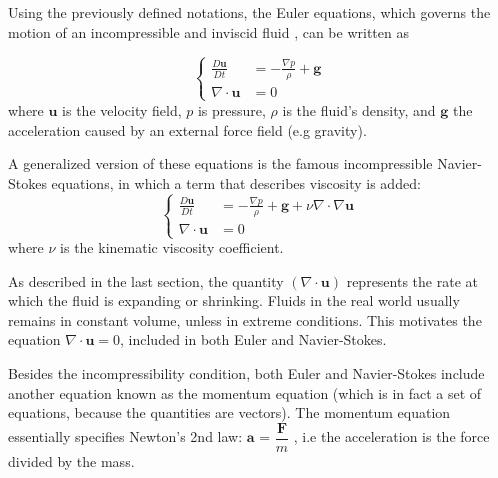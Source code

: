 Using the previously defined notations, the Euler equations, which governs the motion of an incompressible and inviscid fluid
, can be written as

\begin{equation}
    \tag{Euler Equations}
    \left \{
    \begin{aligned}
         \frac{D\textbf{u}}{Dt}   &=   -\frac{\nabla p}{\rho} + \textbf{g} \\
         \nabla \cdot \textbf{u}   &=   0
    \end{aligned} \right.
    \label{eqn:Euler Equations}
\end{equation} 
where $\textbf{u}$ is the velocity field, $p$ is pressure, $\rho$ is the fluid's density, and $\textbf{g}$ the acceleration caused by an external force field (e.g gravity).

A generalized version of these equations is the famous incompressible Navier-Stokes equations, in which a term that describes viscosity is added:
\begin{equation}
    \tag{Navier-Stokes Equations}
    \left \{
    \begin{aligned}
         \frac{D\textbf{u}}{Dt}   &=   -\frac{\nabla p}{\rho} + \textbf{g} + \nu \nabla \cdot \nabla \textbf{u} \\
         \nabla \cdot \textbf{u}  &=   0
    \end{aligned} \right.
    \label{eqn:Navier-Stokes Equations}
\end{equation} 
where $\nu$ is the kinematic viscosity coefficient.


As described in the last section, the quantity $(\nabla \cdot \textbf{u})$ represents the rate at which the fluid is expanding or shrinking. Fluids in the real world usually remains in constant volume, unless in extreme conditions. This motivates the equation $\nabla \cdot \textbf{u} = 0$, included in both Euler and Navier-Stokes.


Besides the incompressibility condition, both Euler and Navier-Stokes include another equation known as the momentum equation (which is in fact a set of equations, because the quantities are vectors). The momentum equation essentially specifies Newton's 2nd law: $\textbf{a}$ = $\dfrac{\textbf{F}}{m}$ , i.e the acceleration is the force divided by the mass.

